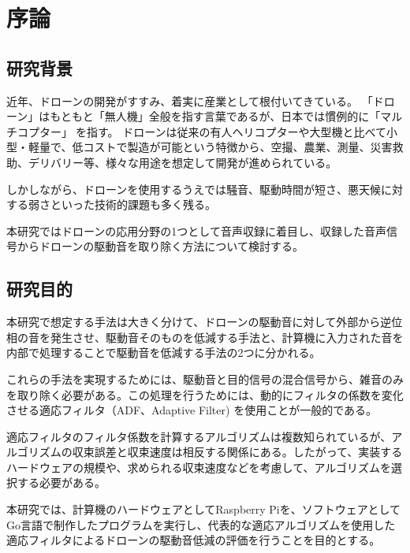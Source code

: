 \hypertarget{ux5e8fux8ad6}{%
\section{序論}\label{ux5e8fux8ad6}}

\hypertarget{ux7814ux7a76ux80ccux666f}{%
\subsection{研究背景}\label{ux7814ux7a76ux80ccux666f}}

近年、ドローンの開発がすすみ、着実に産業として根付いてきている。
「ドローン」はもともと「無人機」全般を指す言葉であるが、日本では慣例的に「マルチコプター」を指す。
ドローンは従来の有人ヘリコプターや大型機と比べて小型・軽量で、低コストで製造が可能という特徴から、空撮、農業、測量、災害救助、デリバリー等、様々な用途を想定して開発が進められている。

しかしながら、ドローンを使用するうえでは騒音、駆動時間が短さ、悪天候に対する弱さといった技術的課題も多く残る。

本研究ではドローンの応用分野の1つとして音声収録に着目し、収録した音声信号からドローンの駆動音を取り除く方法について検討する。

\hypertarget{ux7814ux7a76ux76eeux7684}{%
\subsection{研究目的}\label{ux7814ux7a76ux76eeux7684}}

本研究で想定する手法は大きく分けて、ドローンの駆動音に対して外部から逆位相の音を発生させ、駆動音そのものを低減する手法と、計算機に入力された音を内部で処理することで駆動音を低減する手法の2つに分かれる。

これらの手法を実現するためには、駆動音と目的信号の混合信号から、雑音のみを取り除く必要がある。この処理を行うためには、動的にフィルタの係数を変化させる適応フィルタ（ADF、Adaptive
Filter) を使用ことが一般的である。

適応フィルタのフィルタ係数を計算するアルゴリズムは複数知られているが、アルゴリズムの収束誤差と収束速度は相反する関係にある。したがって、実装するハードウェアの規模や、求められる収束速度などを考慮して、アルゴリズムを選択する必要がある。

本研究では、計算機のハードウェアとしてRaspberry
Piを、ソフトウェアとしてGo言語で制作したプログラムを実行し、代表的な適応アルゴリズムを使用した適応フィルタによるドローンの駆動音低減の評価を行うことを目的とする。
